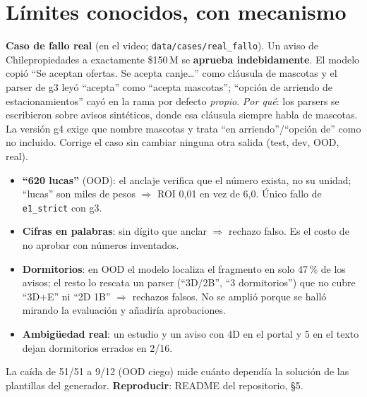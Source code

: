 \documentclass[9pt,a4paper,twocolumn]{extarticle}
\newcommand{\cod}[1]{\texttt{#1}}
\begin{document}
\section{Límites conocidos, con mecanismo}
\textbf{Caso de fallo real} (en el video; \cod{data/cases/real\_fallo}). Un aviso de
Chilepropiedades a exactamente \$150\,M se \textbf{aprueba indebidamente}. El modelo copió
``Se aceptan ofertas. Se acepta canje\ldots'' como cláusula de mascotas y el parser de g3 leyó
``acepta'' como ``acepta mascotas''; ``opción de arriendo de estacionamientos'' cayó en la
rama por defecto \emph{propio}. \emph{Por qué}: los parsers se escribieron sobre avisos
sintéticos, donde esa cláusula siempre habla de mascotas. La versión g4 exige que nombre
mascotas y trata ``en arriendo''/``opción de'' como no incluido. Corrige el caso sin cambiar
ninguna otra salida (test, dev, OOD, real).
\begin{itemize}
\item \textbf{``620 lucas''} (OOD): el anclaje verifica que el número exista, no su unidad;
  ``lucas'' son miles de pesos $\Rightarrow$ ROI 0,01 en vez de 6,0. Único fallo de
  \cod{e1\_strict} con g3.
\item \textbf{Cifras en palabras}: sin dígito que anclar $\Rightarrow$ rechazo falso. Es el
  costo de no aprobar con números inventados.
\item \textbf{Dormitorios}: en OOD el modelo localiza el fragmento en solo 47\,\% de los
  avisos; el resto lo rescata un parser (``3D/2B'', ``3 dormitorios'') que no cubre ``3D+E''
  ni ``2D 1B'' $\Rightarrow$ rechazos falsos. No se amplió porque se halló mirando la
  evaluación y añadiría aprobaciones.
\item \textbf{Ambigüedad real}: un estudio y un aviso con 4D en el portal y 5 en el texto
  dejan dormitorios errados en 2/16.
\end{itemize}
La caída de 51/51 a 9/12 (OOD ciego) mide cuánto dependía la solución de las plantillas del
generador. \textbf{Reproducir}: README del repositorio, §5.
\end{document}
